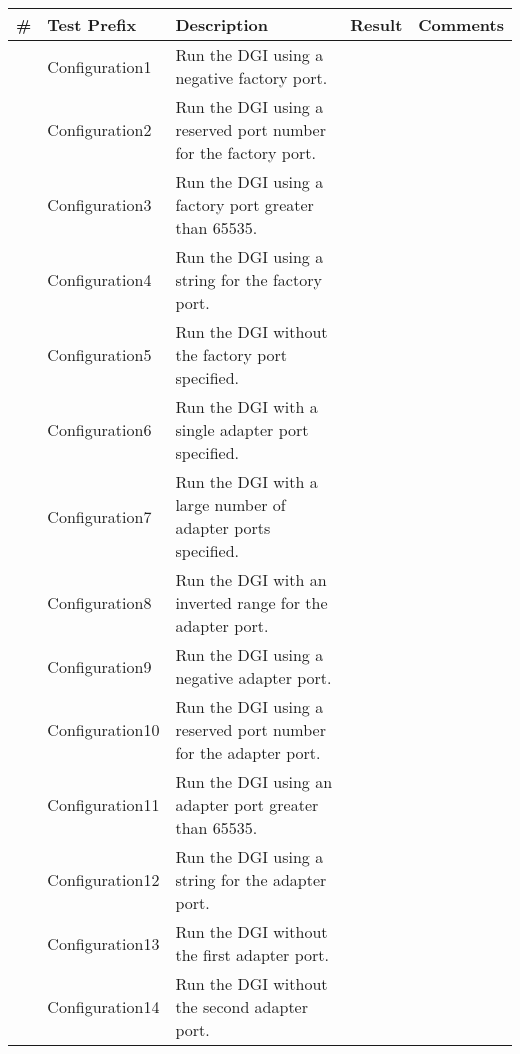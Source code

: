 \documentclass{article}
\newcommand{\pass}{\textcolor{OliveGreen}{PASS}}
\newcommand{\fail}{\textcolor{BrickRed}{FAIL}}
\newcounter{rownum}
\newcommand\rownumber{\stepcounter{rownum}\arabic{rownum}}
\begin{document}
\centering
\begin{longtable}{|c|p{4cm}|p{5cm}|c|p{6cm}|}
    \hline
    \# & Test Prefix & Description & Result & Comments \\ \hline \endhead \hline \endfoot
    \rownumber & Configuration1 & Run the DGI using a negative factory port.
               & & \\
    \rownumber & Configuration2 & Run the DGI using a reserved port number for the factory port.
               & & \\
    \rownumber & Configuration3 & Run the DGI using a factory port greater than 65535.
               & & \\
    \rownumber & Configuration4 & Run the DGI using a string for the factory port.
               & & \\
    \rownumber & Configuration5 & Run the DGI without the factory port specified.
               & & \\
    \rownumber & Configuration6 & Run the DGI with a single adapter port specified.
               & & \\
    \rownumber & Configuration7 & Run the DGI with a large number of adapter ports specified.
               & & \\
    \rownumber & Configuration8 & Run the DGI with an inverted range for the adapter port.
               & & \\
    \rownumber & Configuration9 & Run the DGI using a negative adapter port.
               & & \\
    \rownumber & Configuration10 & Run the DGI using a reserved port number for the adapter port.
               & & \\
    \rownumber & Configuration11 & Run the DGI using an adapter port greater than 65535.
               & & \\
    \rownumber & Configuration12 & Run the DGI using a string for the adapter port.
               & & \\
    \rownumber & Configuration13 & Run the DGI without the first adapter port.
               & & \\
    \rownumber & Configuration14 & Run the DGI without the second adapter port.
               & & \\

\end{longtable}
\end{document}
